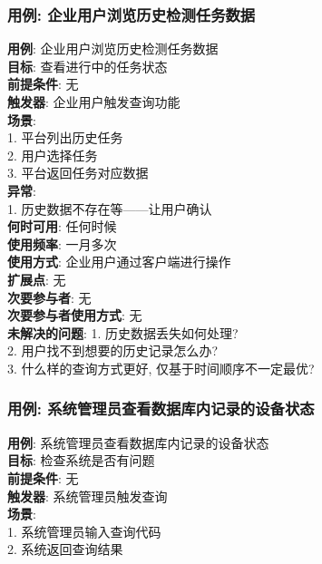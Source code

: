 \documentclass[UTF8]{article}
\begin{document}
\subsubsection{用例: 企业用户浏览历史检测任务数据}
\noindent
\textbf{用例}: 企业用户浏览历史检测任务数据
\\
\textbf{目标}: 查看进行中的任务状态
\\
\textbf{前提条件}: 无
\\
\textbf{触发器}: 企业用户触发查询功能
\\
\textbf{场景}: \\
	\hspace*{2em} 1. 平台列出历史任务 \\
	\hspace*{2em} 2. 用户选择任务 \\
	\hspace*{2em} 3. 平台返回任务对应数据 \\
	
\textbf{异常}: \\
	\hspace*{2em} 1. 历史数据不存在等——让用户确认 \\
\textbf{何时可用}: 任何时候 \\
\textbf{使用频率}: 一月多次 \\
\textbf{使用方式}: 企业用户通过客户端进行操作 \\
\textbf{扩展点}: 无 \\
\textbf{次要参与者}: 无 \\
\textbf{次要参与者使用方式}: 无 \\
\textbf{未解决的问题}: 
	\hspace*{2em} 1. 历史数据丢失如何处理? \\
	\hspace*{2em} 2. 用户找不到想要的历史记录怎么办? \\
	\hspace*{2em} 3. 什么样的查询方式更好, 仅基于时间顺序不一定最优? \\
				
\subsubsection{用例: 系统管理员查看数据库内记录的设备状态}
\noindent
\textbf{用例}: 系统管理员查看数据库内记录的设备状态
\\
\textbf{目标}: 检查系统是否有问题
\\
\textbf{前提条件}: 无
\\
\textbf{触发器}: 系统管理员触发查询
\\
\textbf{场景}: \\
	\hspace*{2em} 1. 系统管理员输入查询代码 \\
	\hspace*{2em} 2. 系统返回查询结果 \\
	
\end{document}
